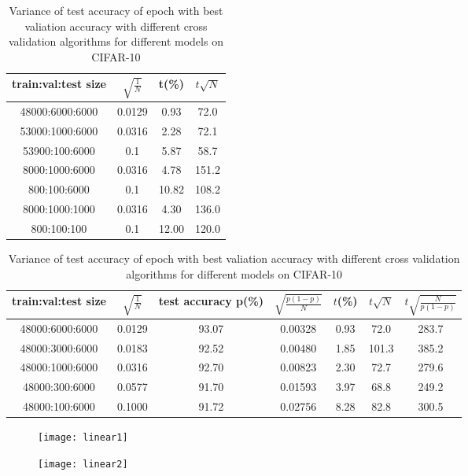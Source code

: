 \begin{table}[!htbp]
	\centering
	\caption{Variance of test accuracy of epoch with best valiation accuracy with different cross validation algorithms  for different models on CIFAR-10}
	\begin{tabular}{|c|c|c|c|}
		\hline
%		
train:val:test size &	$\sqrt{\frac{1}{N}}$ 	&	t(\%)	&	$t\sqrt{N}$	\\\hline
48000:6000:6000	&	0.0129&	0.93&	72.0	\\\hline
53000:1000:6000	&	0.0316&	2.28	&	72.1	\\\hline
53900:100:6000	&	0.1	&	5.87&	58.7	\\\hline
8000:1000:6000		&	0.0316&	4.78	&	151.2	\\\hline
800:100:6000		&	0.1	&	10.82&	108.2	\\\hline
8000:1000:1000	&	0.0316&	4.30	&	136.0	\\\hline
800:100:100	&	0.1	&	12.00&	120.0\\\hline
	\end{tabular}
\end{table}


\begin{table}[!htbp]
	\centering
	\caption{Variance of test accuracy of epoch with best valiation accuracy with different cross validation algorithms  for different models on CIFAR-10}
	\begin{tabular}{|c|c|c|c|c|c|c|}
		\hline
%		
train:val:test size	&	$\sqrt{\frac{1}{N}}$ 	&	test accuracy p(\%)	&	$\sqrt{\frac{p(1-p)}{N}}$ 	&	$t$(\%)	&	$t\sqrt{N}$	&	$t\sqrt{\frac{N}{p(1-p)}}$	\\\hline
48000:6000:6000	&	0.0129	&	93.07	&	0.00328	&	0.93	&	72.0	&	283.7	\\\hline
48000:3000:6000	&	0.0183	&	92.52	&	0.00480	&	1.85	&	101.3	&	385.2	\\\hline
48000:1000:6000	&	0.0316	&	92.70	&	0.00823	&	2.30	&	72.7	&	279.6	\\\hline
48000:300:6000	&	0.0577	&	91.70	&	0.01593	&	3.97	&	68.8	&	249.2	\\\hline
48000:100:6000	&	0.1000	&	91.72	&	0.02756	&	8.28	&	82.8	&	300.5	\\\hline
	\end{tabular}
\end{table}

\begin{figure}[!htbp]
\centering
\texttt{[image: linear1]}
\end{figure}

\begin{figure}[!htbp]
\centering
\texttt{[image: linear2]}
\end{figure}
\newpage